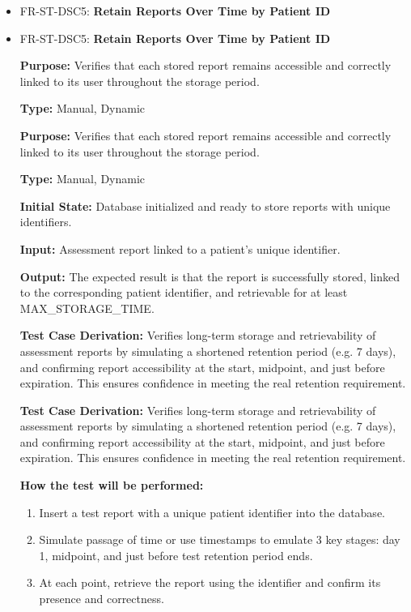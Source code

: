 \documentclass[12pt, titlepage]{article}
\begin{document}
\begin{itemize}
  \item FR-ST-DSC5: \textbf{Retain Reports Over Time by Patient ID}
  \item FR-ST-DSC5: \textbf{Retain Reports Over Time by Patient ID}
  \begin{mdframed}[linewidth=0.5mm]
      \textbf{Purpose:} Verifies that each stored report remains accessible and correctly linked to its user throughout the storage period. \par
      \textbf{Type:} Manual, Dynamic \par
      \textbf{Purpose:} Verifies that each stored report remains accessible and correctly linked to its user throughout the storage period. \par
      \textbf{Type:} Manual, Dynamic \par
      \textbf{Initial State:} Database initialized and ready to store reports with unique identifiers. \par
      \textbf{Input:} Assessment report linked to a patient’s unique identifier. \par
      \textbf{Output:} The expected result is that the report is successfully stored, linked to the corresponding patient identifier, and retrievable for at least MAX\_STORAGE\_TIME. \par
      \textbf{Test Case Derivation:} Verifies long-term storage and retrievability of assessment reports by simulating a shortened retention period (e.g. 7 days), and confirming report accessibility at the start, midpoint, and just before expiration. This ensures confidence in meeting the real retention requirement. \par
      \textbf{Test Case Derivation:} Verifies long-term storage and retrievability of assessment reports by simulating a shortened retention period (e.g. 7 days), and confirming report accessibility at the start, midpoint, and just before expiration. This ensures confidence in meeting the real retention requirement. \par
      \textbf{How the test will be performed:}
      \begin{enumerate}[noitemsep]
        \item Insert a test report with a unique patient identifier into the database.
        \item Simulate passage of time or use timestamps to emulate 3 key stages: day 1, midpoint, and just before test retention period ends.
        \item At each point, retrieve the report using the identifier and confirm its presence and correctness.

\end{enumerate}
\end{mdframed}
\end{itemize}
\end{document}
